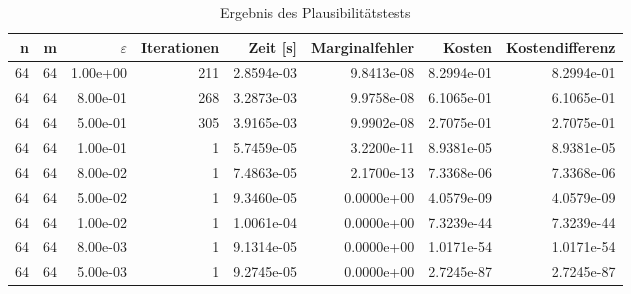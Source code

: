 \begin{table}[htbp]
\caption{Ergebnis des Plausibilitätstests}
\label{tab:Plausibilitaetstest64}
\small
\centering
{}
\begin{tabular}{rrrrrrrr}
\toprule
n & m & $\varepsilon$ & Iterationen & Zeit [s] & Marginalfehler & Kosten & Kostendifferenz \\
\midrule
64 & 64 & 1.00e+00 & 211 & 2.8594e-03 & 9.8413e-08 & 8.2994e-01 & 8.2994e-01 \\
64 & 64 & 8.00e-01 & 268 & 3.2873e-03 & 9.9758e-08 & 6.1065e-01 & 6.1065e-01 \\
64 & 64 & 5.00e-01 & 305 & 3.9165e-03 & 9.9902e-08 & 2.7075e-01 & 2.7075e-01 \\
64 & 64 & 1.00e-01 & 1 & 5.7459e-05 & 3.2200e-11 & 8.9381e-05 & 8.9381e-05 \\
64 & 64 & 8.00e-02 & 1 & 7.4863e-05 & 2.1700e-13 & 7.3368e-06 & 7.3368e-06 \\
64 & 64 & 5.00e-02 & 1 & 9.3460e-05 & 0.0000e+00 & 4.0579e-09 & 4.0579e-09 \\
64 & 64 & 1.00e-02 & 1 & 1.0061e-04 & 0.0000e+00 & 7.3239e-44 & 7.3239e-44 \\
64 & 64 & 8.00e-03 & 1 & 9.1314e-05 & 0.0000e+00 & 1.0171e-54 & 1.0171e-54 \\
64 & 64 & 5.00e-03 & 1 & 9.2745e-05 & 0.0000e+00 & 2.7245e-87 & 2.7245e-87 \\
\bottomrule
\end{tabular}
\end{table}
